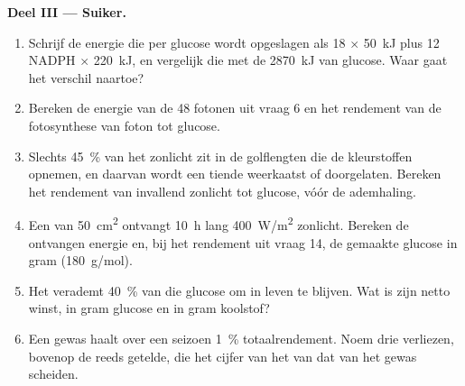 \begin{problem}
\medskip
\noindent\textbf{Deel III --- Suiker.}
\begin{enumerate}[resume]
  \item Schrijf de energie die per glucose wordt opgeslagen als 18 
        $\times$ \qty{50}{kJ} plus 12 NADPH $\times$ \qty{220}{kJ}, en
        vergelijk die met de \qty{2870}{kJ} van glucose. Waar gaat het
        verschil naartoe?
  \item Bereken de energie van de 48 fotonen uit vraag 6 en het rendement
        van de fotosynthese van foton tot glucose.
  \item Slechts \qty{45}{\%} van het zonlicht zit in de golflengten die de
        kleurstoffen opnemen, en daarvan wordt een tiende weerkaatst of
        doorgelaten. Bereken het rendement van invallend zonlicht tot
        glucose, vóór de ademhaling.
  \item Een  van \qty{50}{cm^2} ontvangt \qty{10}{h} lang
        \qty{400}{W/m^2} zonlicht. Bereken de ontvangen energie en, bij het
        rendement uit vraag 14, de gemaakte glucose in gram
        (\qty{180}{g/mol}).
  \item Het  verademt \qty{40}{\%} van die glucose om in leven te
        blijven. Wat is zijn netto winst, in gram glucose en in gram
        koolstof?
  \item Een gewas haalt over een seizoen \qty{1}{\%} totaalrendement. Noem
        drie verliezen, bovenop de reeds getelde, die het cijfer van het
         van dat van het gewas scheiden.
\end{enumerate}


\end{problem}
